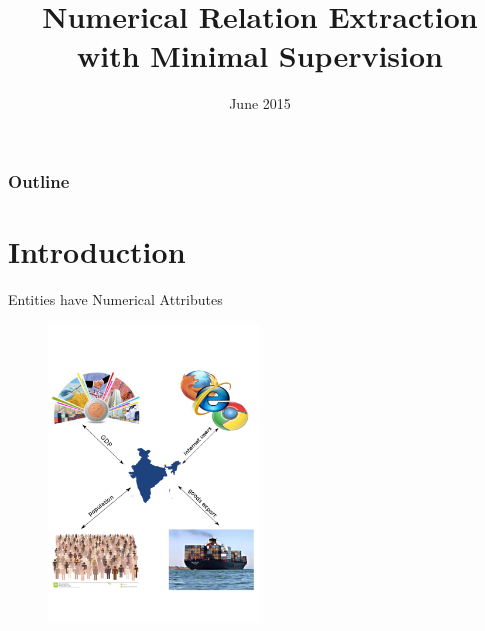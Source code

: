 \documentclass{beamer}
\title[Numerical Relation Extraction with Minimal Supervision]{Numerical Relation Extraction with Minimal Supervision} %
\author{} %
\institute[IITB] %
{
Indian Institute of Technology Bombay\\ %
\medskip
\textit{} %
}
\date{June 2015} %
\begin{document}
\begin{frame}
\titlepage %
\end{frame}

\begin{frame}
\frametitle{Outline} %
\tableofcontents %
\end{frame}


\section{Introduction} %


\begin{frame}{Entities have Numerical Attributes}

    \begin{figure}
    \centering
    \includegraphics[width = 0.5\textwidth]{images/motivation}
  \end{figure}
 
\end{frame}
\end{document}
